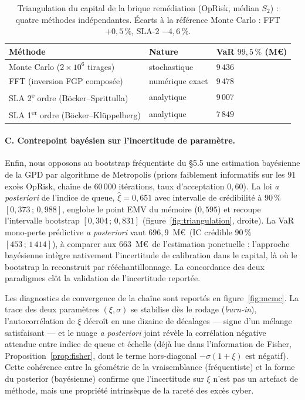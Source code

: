 \documentclass[11pt,a4paper]{article}
\theoremstyle{navystyle}
\theoremstyle{navydef}
\providecommand{\up}[1]{\textsuperscript{#1}}
\begin{document}
\begin{table}[h]
\centering
\setlength{\tabcolsep}{6pt}
\renewcommand{\arraystretch}{1.25}
\begin{tabular}{>{\raggedright}p{6.5cm} >{\centering}p{3cm} >{\centering\arraybackslash}p{3cm}}
\toprule
\rowcolor{lightblue}
\textbf{Méthode} & \textbf{Nature} & \textbf{VaR $99{,}5\,\%$ (M\euro)} \\
\midrule
Monte Carlo ($2\times10^6$ tirages) & stochastique & $9\,436$ \\
FFT (inversion FGP composée) & numérique exact & $9\,478$ \\
SLA 2\up{e} ordre (Böcker--Sprittulla) & analytique & $9\,007$ \\
SLA 1\up{er} ordre (Böcker--Klüppelberg) & analytique & $7\,849$ \\
\bottomrule
\end{tabular}
\caption{Triangulation du capital de la brique remédiation (OpRisk, médian $S_2$) : quatre méthodes indépendantes. Écarts à la référence Monte Carlo : FFT $+0{,}5\,\%$, SLA-2 $-4{,}6\,\%$.}
\label{tab:triangulation}
\end{table}

\paragraph{C. Contrepoint bayésien sur l'incertitude de paramètre.} Enfin, nous opposons au bootstrap fréquentiste du §5.5 une estimation bayésienne de la GPD par algorithme de Metropolis (priors faiblement informatifs sur les $91$ excès OpRisk, chaîne de $60\,000$ itérations, taux d'acceptation $0{,}60$). La loi \emph{a posteriori} de l'indice de queue, $\hat\xi=0{,}651$ avec intervalle de crédibilité à $90\,\%$ $[0{,}373\,;\,0{,}988]$, englobe le point EMV du mémoire ($0{,}595$) et recoupe l'intervalle bootstrap $[0{,}304\,;\,0{,}831]$ (figure~\ref{fig:triangulation}, droite). La VaR mono-perte prédictive \emph{a posteriori} vaut $696{,}9$~M\euro\ (IC crédible $90\,\%$ $[453\,;\,1\,414]$), à comparer aux $663$~M\euro\ de l'estimation ponctuelle : l'approche bayésienne intègre nativement l'incertitude de calibration dans le capital, là où le bootstrap la reconstruit par rééchantillonnage. La concordance des deux paradigmes clôt la validation de l'incertitude reportée.

Les diagnostics de convergence de la chaîne sont reportés en figure~\ref{fig:mcmc}. La trace des deux paramètres $(\xi,\sigma)$ se stabilise dès le rodage (\emph{burn-in}), l'autocorrélation de $\xi$ décroît en une dizaine de décalages --- signe d'un mélange satisfaisant --- et le nuage \emph{a posteriori} joint révèle la corrélation négative attendue entre indice de queue et échelle (déjà lue dans l'information de Fisher, Proposition~\ref{prop:fisher}, dont le terme hors-diagonal $-\sigma(1+\xi)$ est négatif). Cette cohérence entre la géométrie de la vraisemblance (fréquentiste) et la forme du posterior (bayésienne) confirme que l'incertitude sur $\xi$ n'est pas un artefact de méthode, mais une propriété intrinsèque de la rareté des excès cyber.
\end{document}
